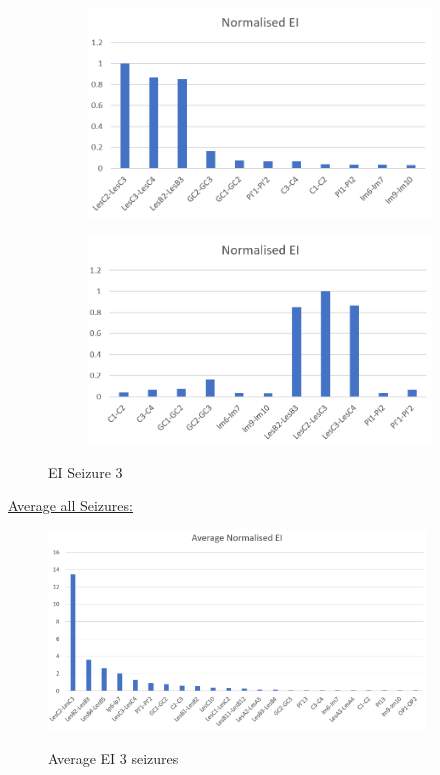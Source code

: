 \documentclass[11pt,oneside]{amsart}
\begin{document}
 \begin{figure}[H]
          \centering
          \begin{subfigure}[H]{0.45\textwidth}
            \centering
              \includegraphics[width=\textwidth]{figures/EI_ord_S3.PNG}
              \label{fig:EI_ordS3}
             \end{subfigure}
             \begin{subfigure}[H]{0.45\textwidth}
              \centering
              \includegraphics[width=\textwidth]{figures/EI_ch_S3.PNG}
              \label{fig:EI_chS3}
          \end{subfigure}
          \caption{EI Seizure 3}
          \label{fig:12}
        \end{figure}
        
\underline{Average all Seizures:}
        
 \begin{figure}[H] \hspace{-0cm} \centering \hspace{0cm}
    \includegraphics[width=10cm,angle=0]{figures/normalised_EI_allSeiz.PNG} \label{fig:13}
        \caption{Average EI 3 seizures} 
       \end{figure}  
       
\end{document}
